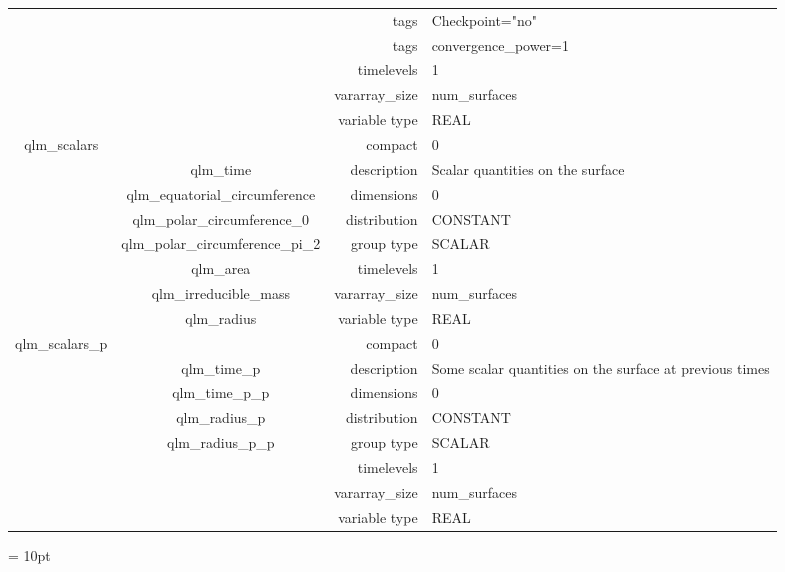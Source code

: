 \begin{tabular*}{150mm}{|c|c@{\extracolsep{\fill}}|rl|}
 &  & tags & Checkpoint="no" \\ 
& ~ & tags & convergence\_power=1 \\ 
 &  & timelevels & 1 \\ 
 &  & vararray\_size & num\_surfaces \\ 
 &  & variable type & REAL \\ 
\hline 
qlm\_scalars &  & compact & 0 \\ 
 & qlm\_time & description & Scalar quantities on the surface \\ 
 & qlm\_equatorial\_circumference & dimensions & 0 \\ 
 & qlm\_polar\_circumference\_0 & distribution & CONSTANT \\ 
 & qlm\_polar\_circumference\_pi\_2 & group type & SCALAR \\ 
 & qlm\_area & timelevels & 1 \\ 
 & qlm\_irreducible\_mass & vararray\_size & num\_surfaces \\ 
 & qlm\_radius & variable type & REAL \\ 
\hline 
qlm\_scalars\_p &  & compact & 0 \\ 
 & qlm\_time\_p & description & Some scalar quantities on the surface at previous times \\ 
 & qlm\_time\_p\_p & dimensions & 0 \\ 
 & qlm\_radius\_p & distribution & CONSTANT \\ 
 & qlm\_radius\_p\_p & group type & SCALAR \\ 
 &  & timelevels & 1 \\ 
 &  & vararray\_size & num\_surfaces \\ 
 &  & variable type & REAL \\ 
\hline 
\end{tabular*} 



\vspace{5mm}\parskip = 10pt 
